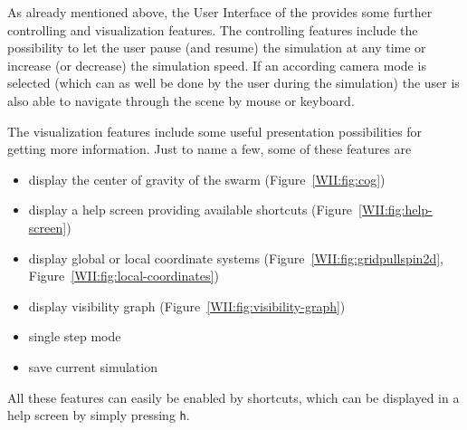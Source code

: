 As already mentioned above, the User Interface of the \RSS provides some further controlling and visualization features. 
The controlling features include the possibility to let the user pause (and resume) the simulation at any time or increase (or decrease) the simulation speed. If an according camera mode is selected (which can as well be done by the user during the simulation) the user is also able to navigate through the scene by mouse or keyboard. \par
The visualization features include some useful presentation possibilities for getting more information. Just to name a few, some of these features are
\begin{itemize}
	\item display the center of gravity of the swarm (Figure~\ref{WII:fig:cog})
	\item display a help screen providing available shortcuts (Figure~\ref{WII:fig:help-screen})
	\item display global or local coordinate systems (Figure~\ref{WII:fig:gridpullspin2d}, Figure~\ref{WII:fig:local-coordinates})
	\item display visibility graph (Figure~\ref{WII:fig:visibility-graph})
	\item single step mode
	\item save current simulation
\end{itemize}
All these features can easily be enabled by shortcuts, which can be displayed in a help screen by simply pressing \texttt{h}.


